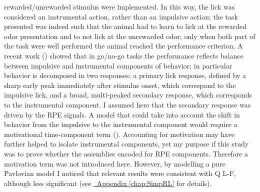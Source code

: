 rewarded/unrewarded stimulus were implemented. In this way, the lick was considered an instrumental action, rather than an impulsive action; the task presented was indeed such that the animal had to learn to lick at the rewarded odor presentation and to not lick at the unrewarded odor; only when both part of the task were well performed the animal  reached the performance criterion. A recent work (\cite{SchultzMot}) showed that in go/no-go tasks the performance reflects balance between impulsive and instrumental components of behavior; in particular behavior is decomposed in two  responses: a primary lick response, defined by a sharp early peak immediately after stimulus onset, which correspond to the impulsive lick, and a broad, multi-peaked secondary response, which corresponds to the instrumental component. I assumed here that the secondary response was driven by the RPE signals. A model that could take into account the shift in behavior from the impulsive to the instrumental component would require a motivational time-component term (\cite{SchultzMot}). Accounting for motivation may have further helped to isolate instrumental components, yet my purpose if this study was to prove  whether the assemblies encoded for RPE components. Therefore a motivation term was not introduced here. However, by modelling a pure Pavlovian model I noticed that relevant results were consistent with Q L-F, although less significant (see \hyperref[chap:SimpRL]{~Appendix \ref*{chap:SimpRL}} for details).\\\\
